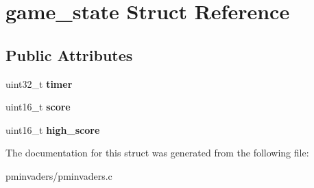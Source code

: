\hypertarget{structgame__state}{}\section{game\+\_\+state Struct Reference}
\label{structgame__state}
\subsection*{Public Attributes}
\begin{DoxyCompactItemize}
\item 
\mbox{\label{structgame__state_aadb7591ec27de3807447e28973a100d4}} 
uint32\+\_\+t {\bfseries timer}
\item 
\mbox{\label{structgame__state_ae8bb405815b2ba7cc4e645dfdfb44aec}} 
uint16\+\_\+t {\bfseries score}
\item 
\mbox{\label{structgame__state_ac43d75a328259837d14b9c1ad6ee1bf0}} 
uint16\+\_\+t {\bfseries high\+\_\+score}
\end{DoxyCompactItemize}


The documentation for this struct was generated from the following file\+:\begin{DoxyCompactItemize}
\item 
pminvaders/pminvaders.\+c\end{DoxyCompactItemize}
